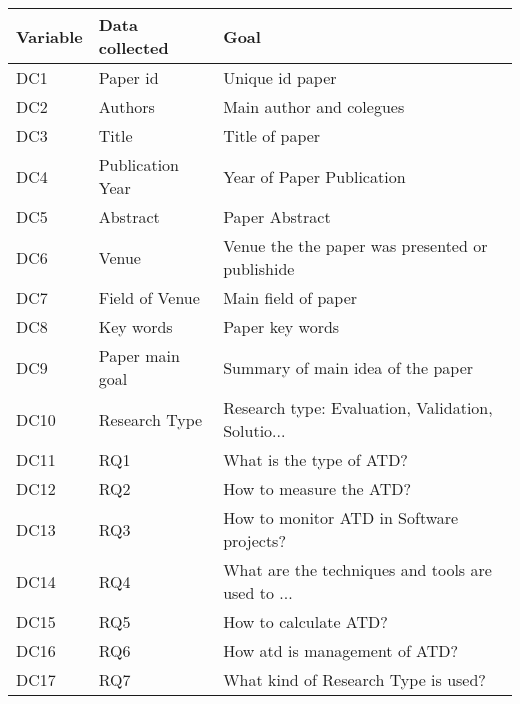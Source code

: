 \begin{tabular}{lll}
\toprule
Variable &    Data collected &                                               Goal \\
\midrule
     DC1 &          Paper id &                                    Unique id paper \\
     DC2 &           Authors &                           Main author and colegues \\
     DC3 &             Title &                                     Title of paper \\
     DC4 &  Publication Year &                          Year of Paper Publication \\
     DC5 &          Abstract &                                     Paper Abstract \\
     DC6 &             Venue &    Venue the the paper was presented or publishide \\
     DC7 &    Field of Venue &                                Main field of paper \\
     DC8 &         Key words &                                    Paper key words \\
     DC9 &   Paper main goal &                  Summary of main idea of the paper \\
    DC10 &     Research Type &  Research type: Evaluation, Validation, Solutio... \\
    DC11 &               RQ1 &                           What is the type of ATD? \\
    DC12 &               RQ2 &                            How to measure the ATD? \\
    DC13 &               RQ3 &           How to monitor ATD in Software projects? \\
    DC14 &               RQ4 &  What are the techniques and tools are used to ... \\
    DC15 &               RQ5 &                              How to calculate ATD? \\
    DC16 &               RQ6 &                      How atd is management of ATD? \\
    DC17 &               RQ7 &                What kind of Research Type is used? \\
\bottomrule
\end{tabular}
